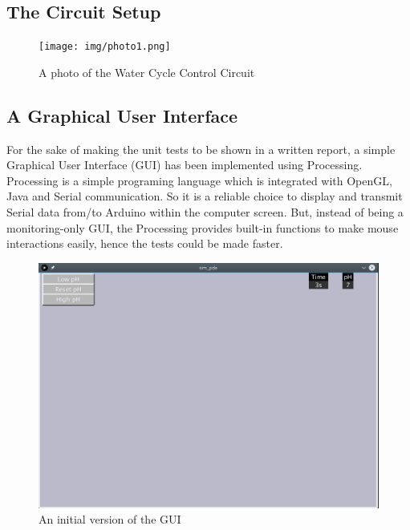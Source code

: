 
\subsection{The Circuit Setup}

\begin{figure}[h]
    \centering
    \texttt{[image: img/photo1.png]}
    \caption{A photo of the Water Cycle Control Circuit}
    \label{fig:photo}
\end{figure}

\subsection{A Graphical User Interface}

For the sake of making the unit tests to be shown in a written report,
a simple Graphical User Interface (GUI) has been implemented using Processing.
Processing is a simple programing language which is integrated with OpenGL,
Java and Serial communication.
So it is a reliable choice to display and transmit Serial data from/to Arduino within the computer screen.
But,
instead of being a monitoring-only GUI,
the Processing provides built-in functions to make mouse interactions easily,
hence the tests could be made faster.

\begin{figure}[h]
    \centering
    \includegraphics[width=.7\textwidth]{img/gui1.png}
    \caption{An initial version of the GUI}
    \label{fig:gui}
\end{figure}
